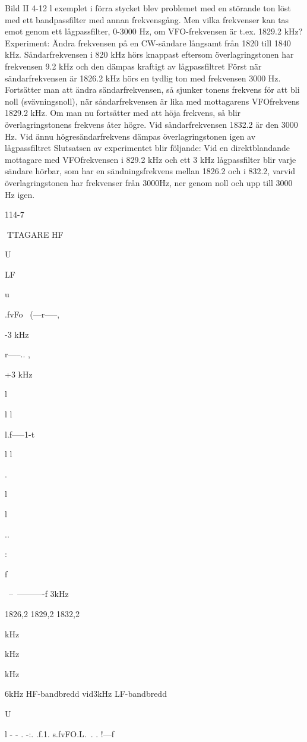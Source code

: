 Bild II 4-12
l exemplet i förra stycket blev problemet
med en störande ton löst med ett bandpassfilter med annan frekvensgång.
Men vilka frekvenser kan tas emot genom
ett lågpassfilter, 0-3000 Hz, om VFO-frekvensen är t.ex. 1829.2 kHz?
Experiment:
Ändra frekvensen på en CW-sändare långsamt från 1820 till 1840 kHz.
Såndarfrekvensen i 820 kHz hörs knappast eftersom överlagringstonen har frekvensen 9.2 kHz och den dämpas kraftigt av
lågpassfiltret Först när sändarfrekvensen
är 1826.2 kHz hörs en tydlig ton med frekvensen 3000 Hz. Fortsätter man att ändra
sändarfrekvensen, så sjunker tonens frekvens för att bli noll (svävningsnoll), när såndarfrekvensen är lika med mottagarens VFOfrekvens 1829.2 kHz. Om man nu fortsätter
med att höja frekvens, så blir överlagringstonens frekvens åter högre. Vid såndarfrekvensen 1832.2 är den 3000 Hz. Vid ännu
högresändarfrekvens dämpas överlagringstonen igen av lågpassfiltret
Slutsatsen av experimentet blir följande:
Vid en direktblandande mottagare med VFOfrekvensen i 829.2 kHz och ett 3 kHz lågpassfilter blir varje sändare hörbar, som har
en sändningsfrekvens mellan 1826.2 och
i 832.2, varvid överlagringstonen har frekvenser från 3000Hz, ner genom noll och upp
till 3000 Hz igen.

114-7

TTAGARE
HF

U

LF

u

.fvFo~
(---r-----,

-3 kHz

r-----.. ,

+3 kHz

l

l
l

l.f-----1-t

l
l

.

l

l

..

:

f

~--~----------f
3kHz

1826,2 1829,2 1832,2

kHz

kHz

kHz

6kHz HF-bandbredd vid3kHz LF-bandbredd

U

l - - . -:. .f.1. s.fvFO.L.~. . !\----f

